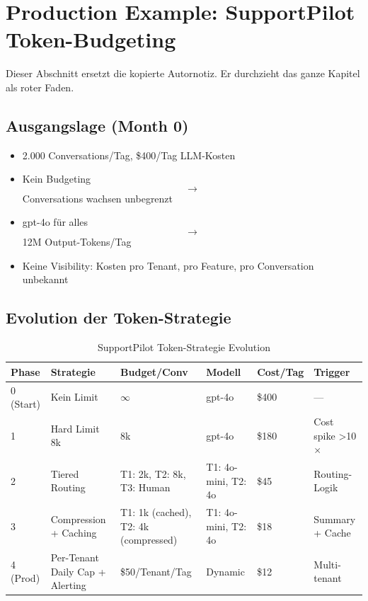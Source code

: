 
\section{Production Example: SupportPilot Token-Budgeting}
\label{sec:supportpilot_token_budget}

Dieser Abschnitt ersetzt die kopierte Autornotiz. Er durchzieht das ganze Kapitel als roter Faden.

\subsection{Ausgangslage (Month 0)}
\label{sec:month_0}

\begin{itemize}[leftmargin=*]
  \item 2.000 Conversations/Tag, \$400/Tag LLM-Kosten
  \item Kein Budgeting $$\to$$ Conversations wachsen unbegrenzt
  \item gpt-4o für alles $$\to$$ 12M Output-Tokens/Tag
  \item Keine Visibility: Kosten pro Tenant, pro Feature, pro Conversation unbekannt
\end{itemize}

\subsection{Evolution der Token-Strategie}
\label{sec:strategy_evolution}

\begin{table}[H]
\centering
\begin{tabularx}{\linewidth}{llXXXX}
\toprule
\textbf{Phase} & \textbf{Strategie} & \textbf{Budget/Conv} & \textbf{Modell} & \textbf{Cost/Tag} & \textbf{Trigger} \\
\midrule
0 (Start) & Kein Limit & $\infty$ & gpt-4o & \$400 & --- \\
1 & Hard Limit 8k & 8k & gpt-4o & \$180 & Cost spike >10$\times$ \\
2 & Tiered Routing & T1: 2k, T2: 8k, T3: Human & T1: 4o-mini, T2: 4o & \$45 & Routing-Logik \\
3 & Compression + Caching & T1: 1k (cached), T2: 4k (compressed) & T1: 4o-mini, T2: 4o & \$18 & Summary + Cache \\
4 (Prod) & Per-Tenant Daily Cap + Alerting & \$50/Tenant/Tag & Dynamic & \$12 & Multi-tenant \\
\bottomrule
\end{tabularx}
\caption{SupportPilot Token-Strategie Evolution}
\label{tab:supportpilot_evolution}
\end{table}

